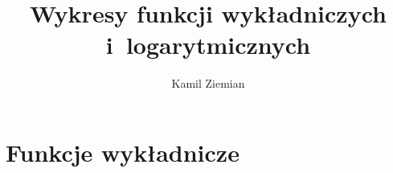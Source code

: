 \documentclass[a4paper,11pt]{article}
\title{Wykresy funkcji wykładniczych i~logarytmicznych}
\author{Kamil Ziemian}
\numberwithin{equation}{section}
\begin{document}





\maketitle





\section{Funkcje wykładnicze}

\label{sec:Funkcje-wykladnicze}
\end{document}
